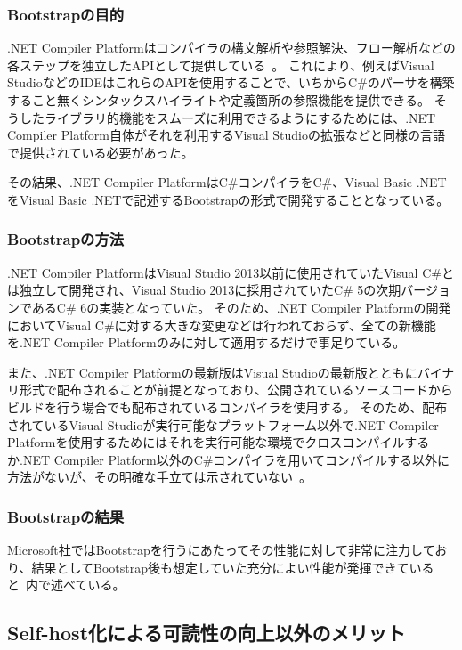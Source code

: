 \subsubsection{Bootstrapの目的}

.NET Compiler Platformはコンパイラの構文解析や参照解決、フロー解析などの各ステップを独立したAPIとして提供している~\cite{roslyn-doc}。
これにより、例えばVisual StudioなどのIDEはこれらのAPIを使用することで、いちからC\#のパーサを構築すること無くシンタックスハイライトや定義箇所の参照機能を提供できる。
そうしたライブラリ的機能をスムーズに利用できるようにするためには、.NET Compiler Platform自体がそれを利用するVisual Studioの拡張などと同様の言語で提供されている必要があった。

その結果、.NET Compiler PlatformはC\#コンパイラをC\#、Visual Basic .NETをVisual Basic .NETで記述するBootstrapの形式で開発することとなっている。

\subsubsection{Bootstrapの方法}

.NET Compiler PlatformはVisual Studio 2013以前に使用されていたVisual C\#とは独立して開発され、Visual Studio 2013に採用されていたC\# 5の次期バージョンであるC\# 6の実装となっていた。
そのため、.NET Compiler Platformの開発においてVisual C\#に対する大きな変更などは行われておらず、全ての新機能を.NET Compiler Platformのみに対して適用するだけで事足りている。

また、.NET Compiler Platformの最新版はVisual Studioの最新版とともにバイナリ形式で配布されることが前提となっており、公開されているソースコードからビルドを行う場合でも配布されているコンパイラを使用する。
そのため、配布されているVisual Studioが実行可能なプラットフォーム以外で.NET Compiler Platformを使用するためにはそれを実行可能な環境でクロスコンパイルするか.NET Compiler Platform以外のC\#コンパイラを用いてコンパイルする以外に方法がないが、その明確な手立ては示されていない~\cite{roslyn-cross-platform}。

\subsubsection{Bootstrapの結果}

Microsoft社ではBootstrapを行うにあたってその性能に対して非常に注力しており、結果としてBootstrap後も想定していた充分によい性能が発揮できていると~\cite{roslyn-performance}内で述べている。


\subsection{Self-host化による可読性の向上以外のメリット}
\label{side-effect:swift:merit}

